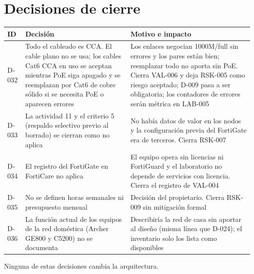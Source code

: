 \documentclass[11pt,a4paper]{article}
\begin{document}
\section{Decisiones de cierre}
{\small
\begin{tabularx}{\textwidth}{L{1.4cm} L{6.4cm} Z}
  \toprule
  \textbf{ID} & \textbf{Decisión} & \textbf{Motivo e impacto}\\
  \midrule
  D-032 & Todo el cableado es CCA. El cable plano no se usa; los cables Cat6 CCA en uso se aceptan mientras PoE siga apagado y se reemplazan por Cat6 de cobre sólido si se necesita PoE o aparecen errores & Los enlaces negocian 1000M/full sin errores y los pares están bien; reemplazar todo no aporta sin PoE. Cierra VAL-006 y deja RSK-005 como riesgo aceptado; D-009 pasa a ser obligatoria; los contadores de errores serán métrica en LAB-005\\
  D-033 & La actividad 11 y el criterio 5 (respaldo selectivo previo al borrado) se cierran como no aplica & No había datos de valor en los nodos y la configuración previa del FortiGate era de terceros. Cierra RSK-007\\
  D-034 & El registro del FortiGate en FortiCare no aplica & El equipo opera sin licencias ni FortiGuard y el laboratorio no depende de servicios con licencia. Cierra el registro de VAL-004\\
  D-035 & No se definen horas semanales ni presupuesto mensual & Decisión del propietario. Cierra RSK-009 sin mitigación formal\\
  D-036 & La función actual de los equipos de la red doméstica (Archer GE800 y C5200) no se documenta & Describiría la red de casa sin aportar al diseño (misma línea que D-024); el inventario solo los lista como disponibles\\
  \bottomrule
\end{tabularx}
}

Ninguna de estas decisiones cambia la arquitectura.

\clearpage
\end{document}
